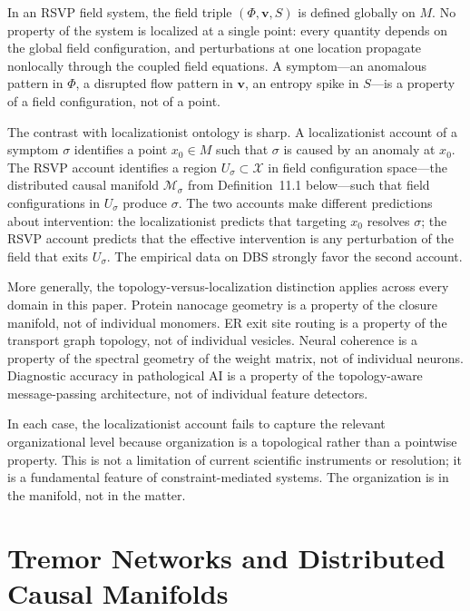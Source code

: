 \documentclass[11pt, oneside]{article}
\numberwithin{equation}{section}
\theoremstyle{rsvpstyle}
\theoremstyle{remark}
\newcommand{\vfield}{\mathbf{v}}
\begin{document}
In an RSVP field system, the field triple $(\Phi, \vfield, S)$ is defined globally on
$M$. No property of the system is localized at a single point: every quantity depends
on the global field configuration, and perturbations at one location propagate
nonlocally through the coupled field equations. A symptom---an anomalous pattern in
$\Phi$, a disrupted flow pattern in $\vfield$, an entropy spike in $S$---is a property
of a field configuration, not of a point.

The contrast with localizationist ontology is sharp. A localizationist account of
a symptom $\sigma$ identifies a point $x_0 \in M$ such that $\sigma$ is caused by
an anomaly at $x_0$. The RSVP account identifies a region $U_\sigma \subset
\mathcal{X}$ in field configuration space---the distributed causal manifold $\mathcal{M}_\sigma$
from Definition~11.1 below---such that field configurations in $U_\sigma$ produce $\sigma$.
The two accounts make different predictions about intervention: the localizationist
predicts that targeting $x_0$ resolves $\sigma$; the RSVP account predicts that
the effective intervention is any perturbation of the field that exits $U_\sigma$.
The empirical data on DBS strongly favor the second account.

More generally, the topology-versus-localization distinction applies across every
domain in this paper. Protein nanocage geometry is a property of the closure manifold,
not of individual monomers. ER exit site routing is a property of the transport graph
topology, not of individual vesicles. Neural coherence is a property of the spectral
geometry of the weight matrix, not of individual neurons. Diagnostic accuracy in
pathological AI is a property of the topology-aware message-passing architecture,
not of individual feature detectors.

In each case, the localizationist account fails to capture the relevant organizational
level because organization is a topological rather than a pointwise property. This
is not a limitation of current scientific instruments or resolution; it is a
fundamental feature of constraint-mediated systems. The organization is in the
manifold, not in the matter.

\section{Tremor Networks and Distributed Causal Manifolds}
\label{sec:tremor}
\end{document}
